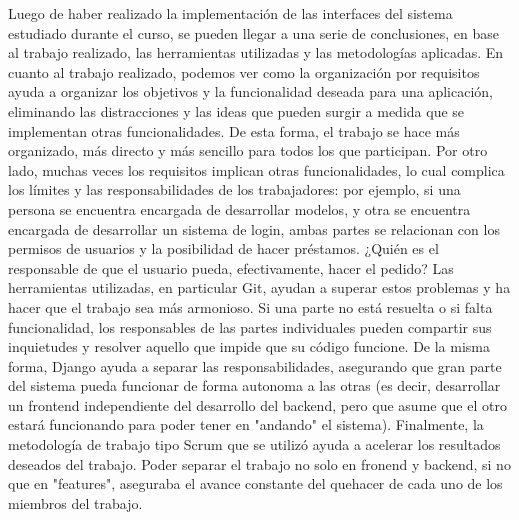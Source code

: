 Luego de haber realizado la implementación de las interfaces del sistema estudiado durante el curso, se pueden llegar a una serie de conclusiones, en base al trabajo realizado, las herramientas utilizadas y las metodologías aplicadas.
En cuanto al trabajo realizado, podemos ver como la organización por requisitos ayuda a organizar los objetivos y la funcionalidad deseada para una aplicación, eliminando las distracciones y las ideas que pueden surgir a medida que se implementan otras funcionalidades. De esta forma, el trabajo se hace más organizado, más directo y más sencillo para todos los que participan. Por otro lado, muchas veces los requisitos implican otras funcionalidades, lo cual complica los límites y las responsabilidades de los trabajadores: por ejemplo, si una persona se encuentra encargada de desarrollar modelos, y otra se encuentra encargada de desarrollar un sistema de login, ambas partes se relacionan con los permisos de usuarios y la posibilidad de hacer préstamos. ¿Quién es el responsable de que el usuario pueda, efectivamente, hacer el pedido?
Las herramientas utilizadas, en particular Git, ayudan a superar estos problemas y ha hacer que el trabajo sea más armonioso. Si una parte no está resuelta o si falta funcionalidad, los responsables de las partes individuales pueden compartir sus inquietudes y resolver aquello que impide que su código funcione. De la misma forma, Django ayuda a separar las responsabilidades, asegurando que gran parte del sistema pueda funcionar de forma autonoma a las otras (es decir, desarrollar un frontend independiente del desarrollo del backend, pero que asume que el otro estará funcionando para poder tener en "andando" el sistema).
Finalmente, la metodología de trabajo tipo Scrum que se utilizó ayuda a acelerar los resultados deseados del trabajo. Poder separar el trabajo no solo en fronend y backend, si no que en "features", aseguraba el avance constante del quehacer de cada uno de los miembros del trabajo.